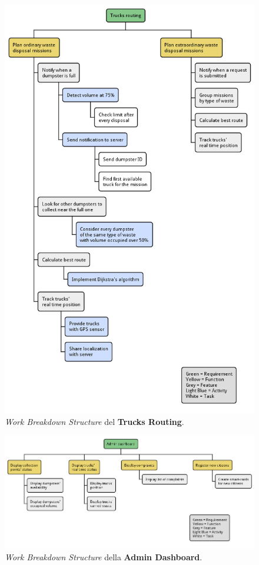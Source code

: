 \begin{figure}[H]
    \centering
    \includegraphics[width=\textwidth]{uml/wbs-trucks-routing.pm}
    \caption{\textit{Work Breakdown Structure} del \textbf{Trucks Routing}.}
    \label{fig:uml/wbs-trucks-routing}
\end{figure}


\begin{figure}[H]
    \centering
    \includegraphics[width=\textwidth]{uml/wbs-admin-dashboard.pm}
    \caption{\textit{Work Breakdown Structure} della \textbf{Admin Dashboard}.}
    \label{fig:uml/wbs-admin-dashboard}
\end{figure}


